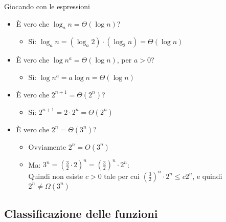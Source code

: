 \begin{frame}{Giocando con le espressioni}

\begin{itemize}
	\item \`E vero che \alert{$\log_a n = \Theta(\log n)$}? \pause
	\begin{itemize}
		\item Sì: $\log_a n = (\log_a 2)\cdot(\log_2 n) = \Theta(\log n)$
	\end{itemize}
	\medskip\pause
	\item \`E vero che \alert{$\log n^a = \Theta(\log n)$}, per $a > 0$?\pause
	\begin{itemize}
		\item Sì: $\log n^a = a \log n = \Theta(\log n)$
	\end{itemize}
	\medskip\pause
    \item \`E vero che \alert{$2^{n+1} = \Theta(2^n)$}?\pause
	\begin{itemize}
		\item Sì: $2^{n+1} = 2 \cdot 2^n = \Theta(2^n)$
	\end{itemize}
	\medskip\pause
    \item \`E vero che \alert{$2^n = \Theta(3^n)$}?\pause
	\begin{itemize}
		\item Ovviamente $2^n = O(3^n)$
		\item Ma: $3^n = \left(\frac{3}{2} \cdot 2\right)^n = \left(\frac{3}{2}\right)^n \cdot 2^n$:\\
		  Quindi non esiste $c>0$ tale per cui $\left(\frac{3}{2}\right)^n \cdot 2^n \leq c2^n$, e quindi
		  \alert{$2^n \neq \Omega(3^n)$}
	\end{itemize}

\end{itemize}

\end{frame}

\subsection{Classificazione delle funzioni}

